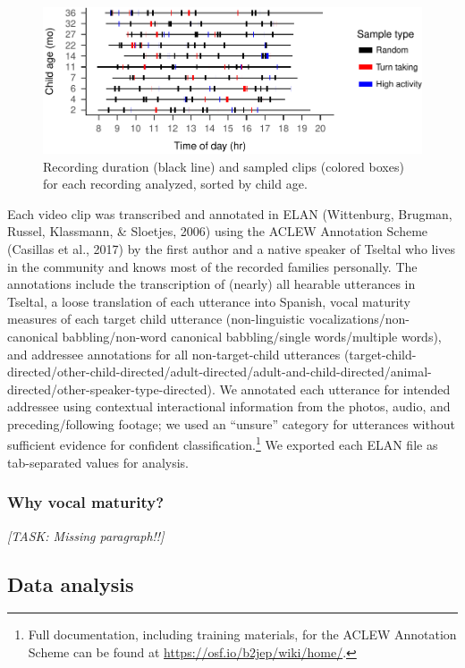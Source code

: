 \documentclass[floatsintext,man]{apa6}
\theoremstyle{definition}
\theoremstyle{definition}
\theoremstyle{definition}
\theoremstyle{remark}
\begin{document}
\begin{figure}
\centering
\includegraphics{Tseltal-CLE_files/figure-latex/fig1-1.pdf}
\caption{\label{fig:fig1}Recording duration (black line) and sampled clips
(colored boxes) for each recording analyzed, sorted by child age.}
\end{figure}

Each video clip was transcribed and annotated in ELAN (Wittenburg,
Brugman, Russel, Klassmann, \& Sloetjes, 2006) using the ACLEW
Annotation Scheme (Casillas et al., 2017) by the first author and a
native speaker of Tseltal who lives in the community and knows most of
the recorded families personally. The annotations include the
transcription of (nearly) all hearable utterances in Tseltal, a loose
translation of each utterance into Spanish, vocal maturity measures of
each target child utterance (non-linguistic vocalizations/non-canonical
babbling/non-word canonical babbling/single words/multiple words), and
addressee annotations for all non-target-child utterances
(target-child-directed/other-child-directed/adult-directed/adult-and-child-directed/animal-directed/other-speaker-type-directed).
We annotated each utterance for intended addressee using contextual
interactional information from the photos, audio, and
preceding/following footage; we used an \enquote{unsure} category for
utterances without sufficient evidence for confident
classification.\footnote{Full documentation, including training
  materials, for the ACLEW Annotation Scheme can be found at
  \url{https://osf.io/b2jep/wiki/home/}.} We exported each ELAN file as
tab-separated values for analysis.

\subsubsection{Why vocal maturity?}\label{why-vocal-maturity}

\emph{{[}TASK: Missing paragraph!!{]}}

\subsection{Data analysis}\label{methods-analysisinfo}
\end{document}
